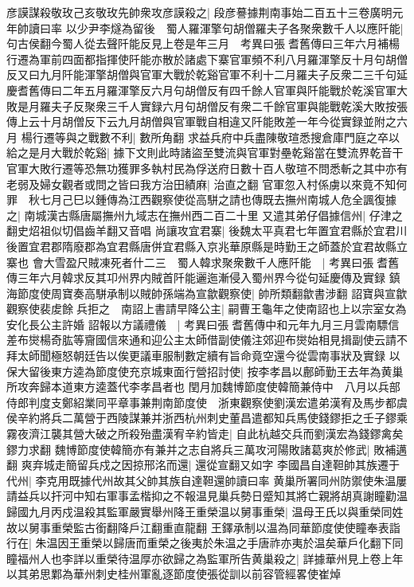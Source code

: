 彦謨謀殺敬玫己亥敬玫先帥衆攻彦謨殺之|{
	段彦謩據荆南事始二百五十三卷廣明元年帥讀曰率}
以少尹李燧為留後　蜀人羅渾擎句胡僧羅夫子各聚衆數千人以應阡能|{
	句古侯翻今蜀人從去聲阡能反見上卷是年三月　考異曰張耆舊傳曰三年六月補楊行遷為軍前四面都指揮使阡能亦散於諸處下寨官軍頻不利八月羅渾擎反十月句胡僧反又曰九月阡能渾擎胡僧與官軍大戰於乾谿官軍不利十二月羅夫子反衆二三千句延慶耆舊傳曰二年五月羅渾擎反六月句胡僧反有四千餘人官軍與阡能戰於乾溪官軍大敗是月羅夫子反聚衆三千人實録六月句胡僧反有衆二千餘官軍與能戰乾溪大敗按張傳上云十月胡僧反下云九月胡僧與官軍戰自相違又阡能敗差一年今從實録並附之六月}
楊行遷等與之戰數不利|{
	數所角翻}
求益兵府中兵盡陳敬瑄悉搜倉庫門庭之卒以給之是月大戰於乾谿|{
	據下文則此時諸盜至雙流與官軍對壘乾谿當在雙流界乾音干}
官軍大敗行遷等恐無功獲罪多執村民為俘送府日數十百人敬瑄不問悉斬之其中亦有老弱及婦女觀者或問之皆曰我方治田績麻|{
	治直之翻}
官軍忽入村係虜以來竟不知何罪　秋七月己巳以鍾傳為江西觀察使從高駢之請也傳既去撫州南城人危全諷復據之|{
	南城漢古縣唐屬撫州九域志在撫州西二百二十里}
又遣其弟仔倡據信州|{
	仔津之翻史炤祖似切倡齒羊翻又音唱}
尚讓攻宜君寨|{
	後魏太平真君七年置宜君縣於宜君川後置宜君郡隋廢郡為宜君縣唐併宜君縣入京兆華原縣是時勤王之師蓋於宜君故縣立寨也}
會大雪盈尺賊凍死者什二三　蜀人韓求聚衆數千人應阡能　|{
	考異曰張耆舊傳三年六月韓求反其卭州界内賊首阡能邐迤漸侵入蜀州界今從句延慶傳及實録}
鎮海節度使周寶奏高駢承制以賊帥孫端為宣歙觀察使|{
	帥所類翻歙書涉翻}
詔寶與宣歙觀察使裴䖍餘兵拒之　南詔上書請早降公主|{
	嗣曹王龜年之使南詔也上以宗室女為安化長公主許婚}
詔報以方議禮儀　|{
	考異曰張耆舊傳中和元年九月三月雲南驃信差布爕楊奇肱等齎國信來通和迎公主太師借副使儀注郊迎布爕始相見揖副使云請不拜太師聞極怒朝廷告以俟更議車服制數定續有旨命竟空還今從雲南事狀及實録}
以保大留後東方逵為節度使充京城東面行營招討使|{
	按李孝昌以鄜師勤王去年為黄巢所攻奔歸本道東方逵蓋代李孝昌者也}
閏月加魏博節度使韓簡兼侍中　八月以兵部侍郎判度支鄭紹業同平章事兼荆南節度使　浙東觀察使劉漢宏遣弟漢宥及馬步都虞侯辛約將兵二萬營于西陵謀兼并浙西杭州刺史董昌遣都知兵馬使錢鏐拒之壬子鏐乘霧夜濟江襲其營大破之所殺殆盡漢宥辛約皆走|{
	自此杭越交兵而劉漢宏為錢鏐禽矣鏐力求翻}
魏博節度使韓簡亦有兼并之志自將兵三萬攻河陽敗諸葛爽於修武|{
	敗補邁翻}
爽弃城走簡留兵戍之因掠邢洺而還|{
	還從宣翻又如字}
李國昌自達靼帥其族遷于代州|{
	李克用既據代州故其父帥其族自達靼還帥讀曰率}
黄巢所署同州防禦使朱温屢請益兵以扞河中知右軍事孟楷抑之不報温見巢兵勢日蹙知其將亡親將胡真謝瞳勸温歸國九月丙戍温殺其監軍嚴實舉州降王重榮温以舅事重榮|{
	温母王氏以與重榮同姓故以舅事重榮監古銜翻降戶江翻重直龍翻}
王鐸承制以温為同華節度使使瞳奉表詣行在|{
	朱温因王重榮以歸唐而重榮之後夷於朱温之手唐祚亦夷於温矣華戶化翻下同}
瞳福州人也李詳以重榮待温厚亦欲歸之為監軍所告黄巢殺之|{
	詳據華州見上卷上年}
以其弟思鄴為華州刺史桂州軍亂逐節度使張從訓以前容管經畧使崔焯

